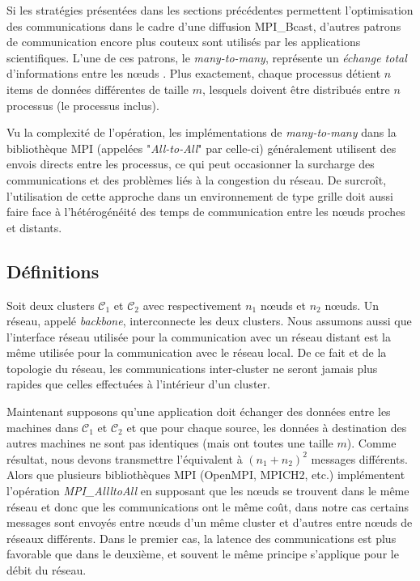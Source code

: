 Si les stratégies présentées dans les sections précédentes permettent l'optimisation des communications dans le cadre d'une diffusion MPI\_Bcast, d'autres patrons de communication encore plus couteux sont utilisés par les applications scientifiques. L'une de ces patrons, le \textit{many-to-many}, représente un \emph{échange total} d'informations entre les n{\oe}uds \cite{Christara99}. Plus exactement, chaque processus détient $n$ items de données différentes de taille $m$, lesquels doivent être distribués entre $n$ processus (le processus inclus).  

Vu la complexité de l'opération, les implémentations de \textit{many-to-many} dans la bibliothèque MPI (appelées "\textit{All-to-All}" par celle-ci) généralement utilisent des envois directs entre les processus, ce qui peut occasionner la surcharge des communications et des problèmes liés à la congestion du réseau. De surcroît, l'utilisation de cette approche dans un environnement de type grille doit aussi faire face à l'hétérogénéité des temps de communication entre les n{\oe}uds proches et distants.

\subsection{Définitions}

Soit deux clusters ${\mathcal C}_1$
et ${\mathcal C}_2$ avec respectivement $n_1$ n{\oe}uds et $n_2$ n{\oe}uds.
Un réseau, appelé \textit{backbone}, interconnecte les deux clusters. Nous assumons aussi que l'interface réseau utilisée pour la communication avec un réseau distant est la même utilisée pour la communication avec le réseau local. De ce fait et de la topologie du réseau, les communications inter-cluster ne seront jamais plus rapides que celles effectuées à l'intérieur d'un cluster.

Maintenant supposons qu'une application doit échanger des données entre les machines dans ${\mathcal C}_1$ et ${\mathcal C}_2$ et que pour chaque source, les données à destination des autres machines ne sont pas identiques (mais ont toutes une taille $m$).  Comme résultat, nous devons transmettre l'équivalent à $(n_1+ n_2)^2$ messages différents. Alors que plusieurs bibliothèques MPI  (OpenMPI, MPICH2, etc.) implémentent l'opération \textit{MPI\_AllltoAll} en supposant que les n{\oe}uds se trouvent dans le même réseau et donc que les communications ont le même coût, dans notre cas certains messages sont envoyés entre n{\oe}uds d'un même cluster et d'autres entre n{\oe}uds de réseaux différents. Dans le premier cas, la latence des communications est plus favorable que dans le deuxième, et souvent le même principe s'applique pour le débit du réseau.


